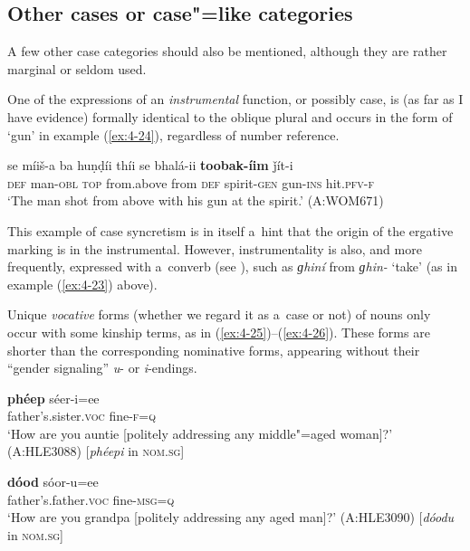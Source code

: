 \subsection{Other cases or case"=like categories}
\label{subsec:4-5-4}

A few other case categories should also be mentioned, although they are rather marginal or seldom used. 


One of the expressions of an \textit{instrumental} function, or possibly case, is (as far as I have evidence) formally identical to the oblique plural and occurs in the form of `gun' in example (\ref{ex:4-24}), regardless of number reference. 


\begin{exe}
\ex
\label{ex:4-24}
\gll se míiš-a ba huṇḍíi thíi se bhalá-ii \textbf{toobak-íim} ǰít-i \\
	\textsc{def} man-\textsc{obl} \textsc{top} from.above from \textsc{def} spirit-\textsc{gen} gun-\textsc{ins} hit.\textsc{pfv-f}\\
\glt `The man shot from above with his gun at the spirit.' (A:WOM671)
\end{exe}

This example of case syncretism is in itself a~hint that the origin of the ergative marking is in the instrumental. However, instrumentality is also, and more frequently, expressed with a~converb (see ), such as \textit{ɡhiní} from \textit{ɡhin-} `take' (as in example (\ref{ex:4-23}) above).


Unique \textit{vocative} forms (whether we regard it as a~case or not) of nouns only occur with some kinship terms, as in (\ref{ex:4-25})--(\ref{ex:4-26}). These forms are shorter than the corresponding nominative forms, appearing without their ``gender signaling'' \textit{u}- or \textit{i}-endings.


\begin{exe}
\ex
\label{ex:4-25}
\gll \textbf{phéep} séer-i=ee \\
	father's.sister.\textsc{voc} fine-\textsc{f=q} \\
\glt `How are you auntie [politely addressing any middle"=aged woman]?' (A:HLE3088) [\textit{phéepi} in \textsc{nom.sg}]
\end{exe}

\begin{exe}
\ex
\label{ex:4-26}
 \gll \textbf{dóod} sóor-u=ee \\
	father's.father.\textsc{voc} fine-\textsc{msg=q} \\
\glt `How are you grandpa [politely addressing any aged man]?' (A:HLE3090) [\textit{dóodu} in \textsc{nom.sg}]
\end{exe}


